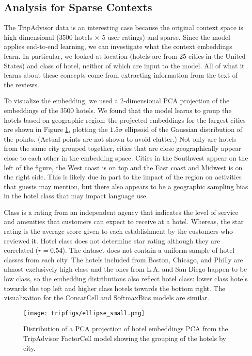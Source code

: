 \subsection{Analysis for Sparse Contexts}
\label{sec:TA_anal}

The TripAdvisor data is an interesting case because the original context space is high dimensional (3500 hotels $\times$ 5 user ratings) and sparse. Since the model applies end-to-end learning, we can investigate what the context embeddings learn. In particular, we looked at location (hotels are from 25 cities in the United States) and class of hotel, neither of which are input to the model. All of what it learns about these concepts come from extracting information from the text of the reviews.


To visualize the embedding, we used a 2-dimensional PCA projection of the embeddings of the 3500 hotels.
We found that the model learns to group the hotels based on geographic region; the projected embeddings for the largest cities are shown in Figure \ref{fig:location_pca}, plotting the $1.5\sigma$ ellipsoid of the Gaussian distribution of the points. (Actual points are not shown to avoid clutter.) Not only are hotels from the same city grouped together, cities that are close geographically appear close to each other in the embedding space. Cities in the Southwest appear on the left of the figure, the West coast is on top and the East coast and Midwest is on the right side. 
This is likely due in part to the impact of the region on activities that guests may mention, but there also appears to be a geographic sampling bias in the hotel class that may impact language use.

Class is a rating from an independent agency that indicates the level of service and amenities that customers can expect to receive at a hotel. Whereas, the star rating is the average score given to each establishment by the customers who reviewed it. Hotel class does not determine star rating although they are correlated ($r=0.54$). 
The dataset does not contain a uniform sample of hotel classes from each city. 
The hotels included from Boston, Chicago, and Philly are almost exclusively high class and the ones from L.A. and San Diego happen to be low class, so the embedding distributions also reflect hotel class: lower class hotels towards the top left and higher class hotels towards the bottom right. The visualization for the ConcatCell and SoftmaxBias models are similar.

\begin{figure}
    \centering
    \texttt{[image: tripfigs/ellipse\_small.png]}
    \caption{Distribution of a PCA projection of hotel embeddings PCA from the TripAdvisor FactorCell model showing the grouping of the hotels by city.}
    \label{fig:location_pca}
\end{figure}

